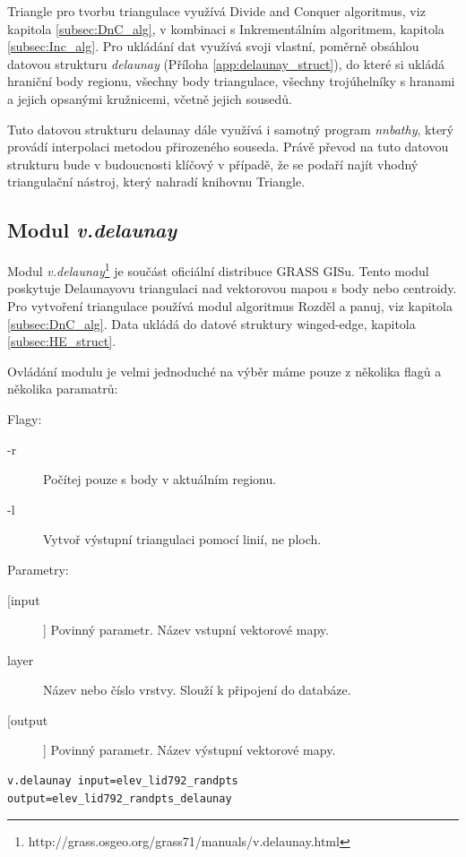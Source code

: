 \documentclass[12pt,a4paper]{article}
\begin{document}
Triangle pro tvorbu triangulace využívá Divide and Conquer algoritmus, viz kapitola \ref{subsec:DnC_alg}, v kombinaci s Inkrementálním algoritmem, kapitola \ref{subsec:Inc_alg}. Pro ukládání dat využívá svoji vlastní, poměrně obsáhlou datovou strukturu \emph{delaunay} (Příloha \ref{app:delaunay_struct}), do které si ukládá hraniční body regionu, všechny body triangulace, všechny trojúhelníky s hranami a jejich opsanými kružnicemi, včetně jejich sousedů. 

Tuto datovou strukturu delaunay dále využívá i samotný program \emph{nnbathy}, který provádí interpolaci metodou přirozeného souseda. Právě převod na tuto datovou strukturu bude v budoucnosti klíčový v případě, že se podaří najít vhodný triangulační nástroj, který nahradí knihovnu Triangle.

\newpage
\subsection{Modul \emph{v.delaunay}}
\label{subsec:v.delaunay}
Modul \emph{v.delaunay}\footnote{http://grass.osgeo.org/grass71/manuals/v.delaunay.html} je součást oficiální distribuce GRASS GISu. Tento modul poskytuje Delaunayovu triangulaci nad vektorovou mapou s body nebo centroidy. Pro vytvoření triangulace používá modul algoritmus Rozděl a panuj, viz kapitola \ref{subsec:DnC_alg}. Data ukládá do datové struktury winged-edge, kapitola \ref{subsec:HE_struct}.

Ovládání modulu je velmi jednoduché na výběr máme pouze z několika flagů a několika paramatrů:

\bigskip
Flagy:
\begin{description}
\item[-r] Počítej pouze s body v aktuálním regionu.
\item[-l] Vytvoř výstupní triangulaci pomocí linií, ne ploch.
\end{description}
\bigskip
Parametry:
\begin{description}
\item[[input]] Povinný parametr. Název vstupní vektorové mapy.
\item[layer] Název nebo číslo vrstvy. Slouží k připojení do databáze.
\item[[output]] Povinný parametr. Název výstupní vektorové mapy.
\end{description}

\begin{lstlisting}[caption={Volání modulu v.delaunay z příkazové řádky}]
v.delaunay input=elev_lid792_randpts output=elev_lid792_randpts_delaunay
\end{lstlisting}
\end{document}
